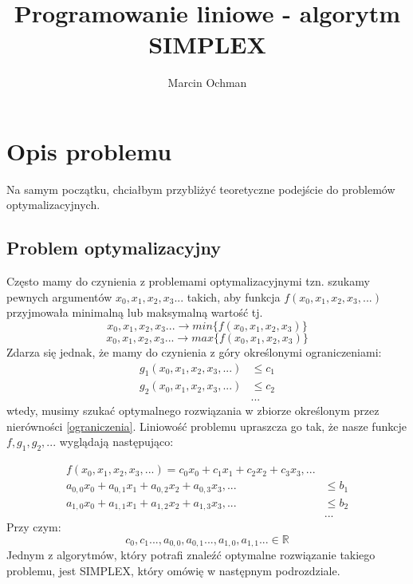 \documentclass[10pt,a4paper]{article}
\author{Marcin Ochman}
\title{Programowanie liniowe - algorytm SIMPLEX}
\begin{document}
\maketitle

\section{Opis problemu}

Na samym początku, chciałbym przybliżyć teoretyczne podejście do problemów 
optymalizacyjnych.

\subsection{Problem optymalizacyjny}
Często mamy do czynienia z problemami optymalizacyjnymi tzn. szukamy pewnych argumentów
$x_0,x_1,x_2,x_3...$ takich, aby funkcja $f(x_0,x_1,x_2,x_3,...)$
przyjmowała minimalną lub maksymalną wartość tj.
\begin{equation}
x_0,x_1,x_2,x_3...\xrightarrow{}min\{f(x_0,x_1,x_2,x_3) \}
\end{equation}
\begin{equation}
x_0,x_1,x_2,x_3...\xrightarrow{}max\{f(x_0,x_1,x_2,x_3) \}
\end{equation}
Zdarza się jednak, że mamy do czynienia z góry określonymi ograniczeniami:
\begin{equation}
\label{ograniczenia}
\begin{aligned}
g_1(x_0,x_1,x_2,x_3,...)&\le c_1\\
g_2(x_0,x_1,x_2,x_3,...)&\le c_2\\
&...
\end{aligned}
\end{equation}
wtedy, musimy szukać optymalnego rozwiązania w zbiorze określonym przez nierówności \ref{ograniczenia}. 
Liniowość problemu upraszcza go tak, że nasze funkcje $f,g_1,g_2,...$ wyglądają następująco:

\begin{equation}
\begin{aligned}
f(x_0,x_1,x_2,x_3,...)=c_0x_0+c_1x_1+c_2x_2+c_3x_3,...\\
a_{0,0}x_0+a_{0,1}x_1+a_{0,2}x_2+a_{0,3}x_3,...&\le b_1\\
a_{1,0}x_0+a_{1,1}x_1+a_{1,2}x_2+a_{1,3}x_3,...&\le b_2\\
&... 
\end{aligned}
\end{equation}
Przy czym:
\begin{equation*}
c_0,c_1..., a_{0,0},a_{0,1}...,a_{1,0},a_{1,1}... \in \mathbb{R}
\end{equation*}
Jednym z algorytmów, który potrafi znaleźć optymalne rozwiązanie takiego problemu, jest
SIMPLEX, który omówię w następnym podrozdziale.
\end{document}
